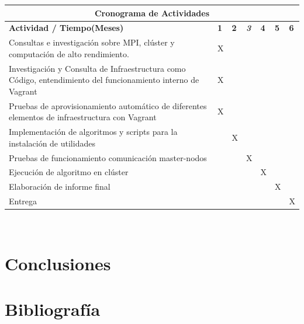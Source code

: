 \documentclass[letterpaper, 12pt, oneside]{article}
\begin{document}
    \begin{center}
    \begin{tabular}{|p{9.5cm}|p{0.4cm}|p{0.4cm}|p{0.4cm}|p{0.4cm}|p{0.4cm}|p{0.4cm}|}
    \hline
    \multicolumn{7}{|c|}{\textbf{Cronograma de Actividades}}\\
    \hline
    \textbf{Actividad / Tiempo(Meses)} & \textbf{1} & \textbf{2} & \textit{\textbf{3}} & \textbf{4} & \textbf{5} & \textbf{6} \\
    \hline
    Consultas e investigación sobre MPI, clúster y computación de alto rendimiento. & X &   &   &   &   &   \\
    \hline
    Investigación y Consulta de Infraestructura como Código, entendimiento del funcionamiento interno de Vagrant & X &   &   &   &   &   \\
    \hline
    Pruebas de aprovisionamiento automático de diferentes elementos de infraestructura con Vagrant & X &   &   &   &   &   \\
    \hline
    Implementación de algoritmos y scripts para la instalación de utilidades &  & X  &   &   &   &   \\
    \hline
    Pruebas de funcionamiento comunicación master-nodos &   &   & X &   &   &   \\
    \hline
    Ejecución de algoritmo en clúster &   &   &   & X &   &   \\
    \hline
    Elaboración de informe final &   &   &   &   & X &   \\
    \hline
    Entrega &   &   &   &   &   & X \\
    \hline
    \end{tabular}
    \end{center} \\
    
    \clearpage
    
    \section{Conclusiones}
    
    \clearpage
    
    \section{Bibliografía}
    
    
    \nocite{*}
    
\end{document}
